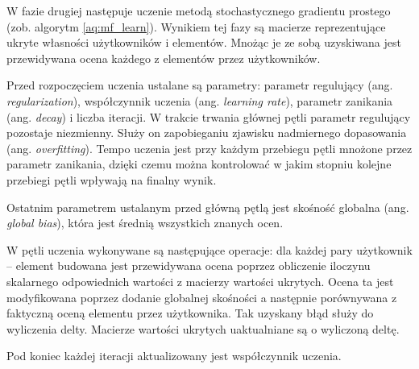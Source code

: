 \documentclass[twoside]{iisthesis}
\begin{document}
		
		W fazie drugiej następuje uczenie metodą stochastycznego gradientu prostego (zob. algorytm  \ref{aq:mf_learn}). Wynikiem tej fazy są macierze reprezentujące ukryte własności użytkowników i elementów. Mnożąc je ze sobą uzyskiwana jest przewidywana ocena każdego z elementów przez użytkowników. 
		
		Przed rozpoczęciem uczenia ustalane są parametry: parametr regulujący (ang. \textit{regularization}), współczynnik uczenia (ang. \textit{learning rate}), parametr zanikania (ang. \textit{decay}) i liczba iteracji. 	
		W trakcie trwania głównej pętli parametr regulujący pozostaje niezmienny. Służy on zapobieganiu zjawisku nadmiernego dopasowania (ang. \textit{overfitting}). Tempo uczenia jest przy każdym przebiegu pętli mnożone przez parametr zanikania, dzięki czemu można kontrolować w jakim stopniu kolejne przebiegi pętli wpływają na finalny wynik. 
		
		Ostatnim parametrem ustalanym przed główną pętlą jest skośność globalna (ang. \textit{global bias}), która jest średnią wszystkich znanych ocen. 
		
		W pętli uczenia wykonywane są następujące operacje: dla każdej pary użytkownik -- element budowana jest przewidywana ocena poprzez obliczenie iloczynu skalarnego odpowiednich wartości z macierzy wartości ukrytych. Ocena ta jest modyfikowana poprzez dodanie globalnej skośności a następnie porównywana z faktyczną oceną elementu przez użytkownika. Tak uzyskany błąd służy do wyliczenia delty. Macierze wartości ukrytych uaktualniane są o wyliczoną deltę. 
		
		Pod koniec każdej iteracji aktualizowany jest współczynnik uczenia.
	
\end{document}
